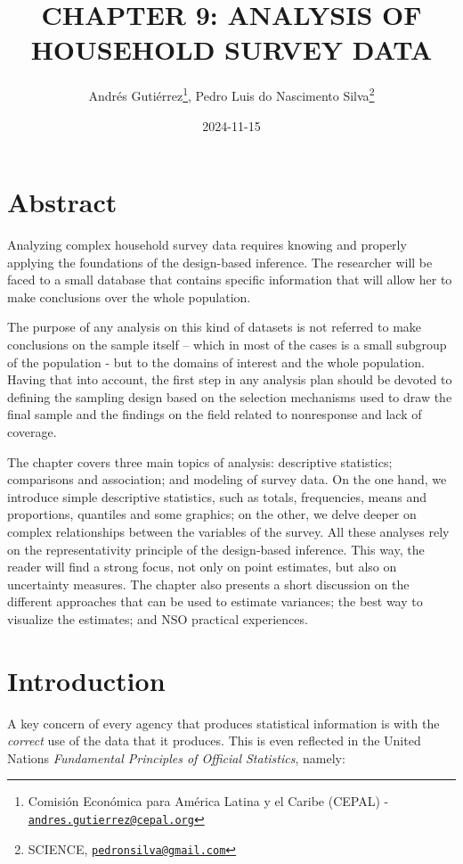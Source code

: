 \documentclass[
  12pt,
]{book}
\title{CHAPTER 9: ANALYSIS OF HOUSEHOLD SURVEY DATA}
\author{Andrés Gutiérrez\footnote{Comisión Económica para América Latina y el Caribe (CEPAL) - \href{mailto:andres.gutierrez@cepal.org}{\nolinkurl{andres.gutierrez@cepal.org}}}, Pedro Luis do Nascimento Silva\footnote{SCIENCE, \href{mailto:pedronsilva@gmail.com}{\nolinkurl{pedronsilva@gmail.com}}}}
\date{2024-11-15}
\begin{document}
\maketitle

{
\hypersetup{linkcolor=}
\setcounter{tocdepth}{0}
\tableofcontents
}
\listoffigures
\listoftables
\chapter*{Abstract}\label{abstract}

Analyzing complex household survey data requires knowing and properly applying the foundations of the design-based inference. The researcher will be faced to a small database that contains specific information that will allow her to make conclusions over the whole population.

The purpose of any analysis on this kind of datasets is not referred to make conclusions on the sample itself -- which in most of the cases is a small subgroup of the population - but to the domains of interest and the whole population. Having that into account, the first step in any analysis plan should be devoted to defining the sampling design based on the selection mechanisms used to draw the final sample and the findings on the field related to nonresponse and lack of coverage.

The chapter covers three main topics of analysis: descriptive statistics; comparisons and association; and modeling of survey data. On the one hand, we introduce simple descriptive statistics, such as totals, frequencies, means and proportions, quantiles and some graphics; on the other, we delve deeper on complex relationships between the variables of the survey. All these analyses rely on the representativity principle of the design-based inference. This way, the reader will find a strong focus, not only on point estimates, but also on uncertainty measures. The chapter also presents a short discussion on the different approaches that can be used to estimate variances; the best way to visualize the estimates; and NSO practical experiences.

\chapter*{Introduction}\label{introduction}

A key concern of every agency that produces statistical information is with the \emph{correct} use of the data that it produces. This is even reflected in the United Nations \emph{Fundamental Principles of Official Statistics}, namely:
\end{document}
